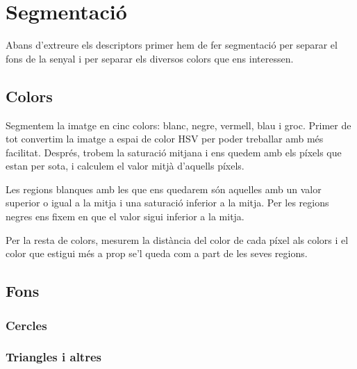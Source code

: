 
%



\section{Segmentació}%
\label{sec:segmentacio}

Abans d'extreure els descriptors primer hem de fer segmentació per separar el fons de la
senyal i per separar els diversos colors que ens interessen.

\subsection{Colors}

Segmentem la imatge en cinc colors: blanc, negre, vermell, blau i groc. 
Primer de tot convertim la imatge a espai de color HSV per poder treballar amb més
facilitat. Després, trobem la saturació mitjana i ens quedem amb els píxels que
estan per sota, i calculem el valor mitjà d'aquells píxels. 

Les regions blanques
amb les que ens quedarem són aquelles amb un valor superior o igual a la mitja i una
saturació inferior a la mitja. Per les regions negres ens fixem en que el valor
sigui inferior a la mitja. 

Per la resta de colors, mesurem la distància del color de
cada píxel als colors i el color que estigui més a prop se'l queda com a part de les
seves regions.

\subsection{Fons}%
\label{sub:seg_fons}

\subsubsection{Cercles}


\subsubsection{Triangles i altres}

